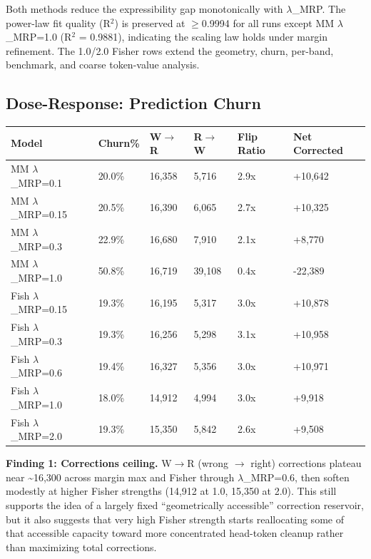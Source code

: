 \documentclass[
  11pt,
]{article}
\begin{document}
Both methods reduce the expressibility gap monotonically with $\lambda$\_MRP.
The power-law fit quality (R$^2$) is preserved at $\geq$0.9994 for all runs
except MM $\lambda$\_MRP=1.0 (R$^2$ = 0.9881), indicating the scaling law holds
under margin refinement. The 1.0/2.0 Fisher rows extend the geometry,
churn, per-band, benchmark, and coarse token-value analysis.

\hypertarget{dose-response-prediction-churn}{%
\subsection{Dose-Response: Prediction
Churn}\label{dose-response-prediction-churn}}

\begin{longtable}[]{@{}llllll@{}}
\toprule\noalign{}
Model & Churn\% & W$\rightarrow$R & R$\rightarrow$W & Flip Ratio & Net Corrected \\
\midrule\noalign{}
\endhead
\bottomrule\noalign{}
\endlastfoot
MM $\lambda$\_MRP=0.1 & 20.0\% & 16,358 & 5,716 & 2.9x & +10,642 \\
MM $\lambda$\_MRP=0.15 & 20.5\% & 16,390 & 6,065 & 2.7x & +10,325 \\
MM $\lambda$\_MRP=0.3 & 22.9\% & 16,680 & 7,910 & 2.1x & +8,770 \\
MM $\lambda$\_MRP=1.0 & 50.8\% & 16,719 & 39,108 & 0.4x & -22,389 \\
Fish $\lambda$\_MRP=0.15 & 19.3\% & 16,195 & 5,317 & 3.0x & +10,878 \\
Fish $\lambda$\_MRP=0.3 & 19.3\% & 16,256 & 5,298 & 3.1x & +10,958 \\
Fish $\lambda$\_MRP=0.6 & 19.4\% & 16,327 & 5,356 & 3.0x & +10,971 \\
Fish $\lambda$\_MRP=1.0 & 18.0\% & 14,912 & 4,994 & 3.0x & +9,918 \\
Fish $\lambda$\_MRP=2.0 & 19.3\% & 15,350 & 5,842 & 2.6x & +9,508 \\
\end{longtable}

\textbf{Finding 1: Corrections ceiling.} W$\rightarrow$R (wrong $\rightarrow$ right) corrections
plateau near \textasciitilde16,300 across margin max and Fisher through
$\lambda$\_MRP=0.6, then soften modestly at higher Fisher strengths (14,912 at
1.0, 15,350 at 2.0). This still supports the idea of a largely fixed
``geometrically accessible'' correction reservoir, but it also suggests
that very high Fisher strength starts reallocating some of that
accessible capacity toward more concentrated head-token cleanup rather
than maximizing total corrections.
\end{document}
